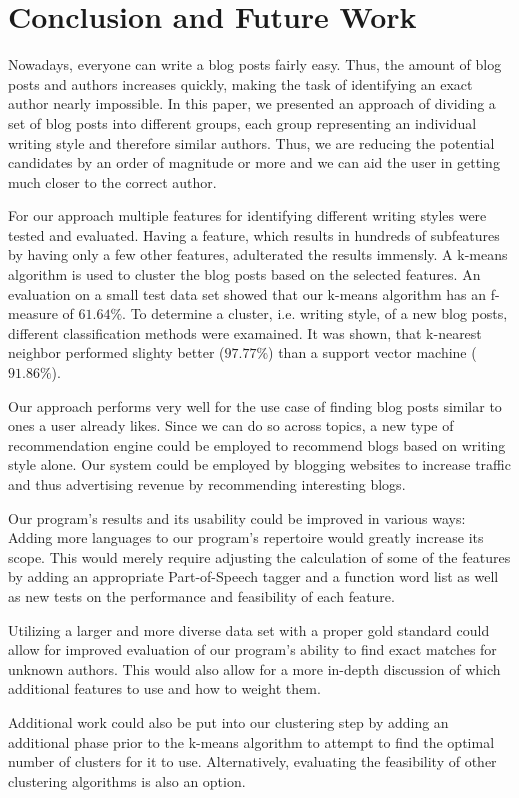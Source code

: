 \section{Conclusion and Future Work}
\label{sec:conclusion}


Nowadays, everyone can write a blog posts fairly easy.
Thus, the amount of blog posts and authors increases quickly, making the task of identifying an exact author nearly impossible.
In this paper, we presented an approach of dividing a set of blog posts into different groups, each group representing an individual writing style and therefore similar authors.
Thus, we are reducing the potential candidates by an order of magnitude or more and we can aid the user in getting much closer to the correct author.


For our approach multiple features for identifying different writing styles were tested and evaluated.
Having a feature, which results in hundreds of subfeatures by having only a few other features, adulterated the results immensly.
A k-means algorithm is used to cluster the blog posts based on the selected features.
An evaluation on a small test data set showed that our k-means algorithm has an f-measure of $61.64\%$.
To determine a cluster, i.e. writing style, of a new blog posts, different classification methods were examained.
It was shown, that k-nearest neighbor performed slighty better ($97.77\%$) than a support vector machine ($91.86\%$).


Our approach performs very well for the use case of finding blog posts similar to ones a user already likes.
Since we can do so across topics, a new type of recommendation engine could be employed to recommend blogs based on writing style alone.
Our system could be employed by blogging websites to increase traffic and thus advertising revenue by recommending interesting blogs.


Our program’s results and its usability could be improved in various ways: Adding more languages to our program’s repertoire would greatly increase its scope.
This would merely require adjusting the calculation of some of the features by adding an appropriate Part-of-Speech tagger and a function word list as well as new tests on the performance and feasibility of each feature.


Utilizing a larger and more diverse data set with a proper gold standard could allow for improved evaluation of our program’s ability to find exact matches for unknown authors.
This would also allow for a more in-depth discussion of which additional features to use and how to weight them.


Additional work could also be put into our clustering step by adding an additional phase prior to the k-means algorithm to attempt to find the optimal number of clusters for it to use.
Alternatively, evaluating the feasibility of other clustering algorithms is also an option.